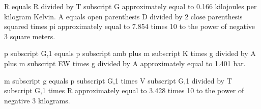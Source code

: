 R equals R divided by T subscript G approximately equal to 0.166 kilojoules per kilogram Kelvin.  
A equals open parenthesis D divided by 2 close parenthesis squared times pi approximately equal to 7.854 times 10 to the power of negative 3 square meters.  

p subscript G,1 equals p subscript amb plus m subscript K times g divided by A plus m subscript EW times g divided by A approximately equal to 1.401 bar.  

m subscript g equals p subscript G,1 times V subscript G,1 divided by T subscript G,1 times R approximately equal to 3.428 times 10 to the power of negative 3 kilograms.